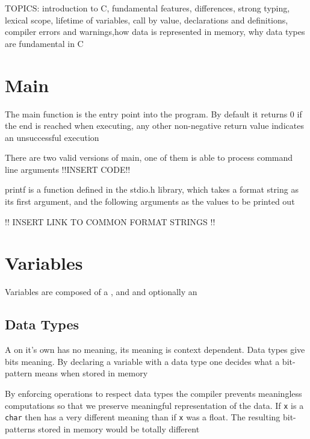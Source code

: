 \lecture{}{}{}

\par{TOPICS: introduction to C, fundamental features, differences, strong
typing, lexical scope, lifetime of variables, call by value, declarations and definitions, compiler
errors and warnings,how data is represented in memory, why data types are fundamental in
C}

\section{Main}
\par{The main function is the entry point into the program. By default it returns 0 if the end
is reached when executing, any other non-negative return value indicates an unsuccessful execution}
\par{There are two valid versions of main, one of them is able to process command line
arguments} !!INSERT CODE!!

\par{printf is a function defined in the stdio.h library, which takes a format string as its
first argument, and the following arguments as the values to be printed out}

!! INSERT LINK TO COMMON FORMAT STRINGS !!


\section{Variables}

\par{Variables are composed of a , and  and optionally an
}


\subsection{Data Types}

\par{A  on it's own has no meaning, its meaning is context dependent. Data
types give bits meaning. By declaring a variable with a data type one decides what a bit-pattern
means when stored in memory}
\par{By enforcing operations to respect data types the compiler prevents meaningless
computations so that we preserve meaningful representation of the data. If \texttt{x} is a
\texttt{char} then  has a very different meaning than if \texttt{x} was a float. The
resulting bit-patterns stored in memory would be totally different}

